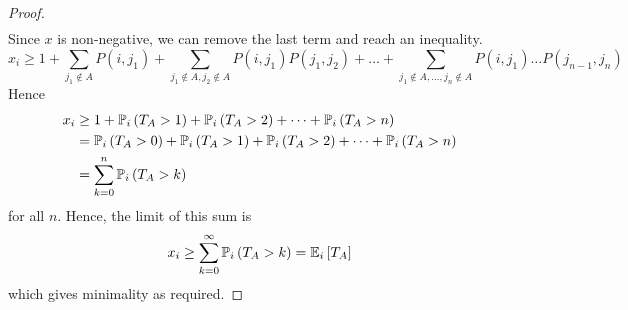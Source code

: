 \begin{proof}
\begin{align*}
	\end{align*}
	Since \( x \) is non-negative, we can remove the last term and reach an inequality.
	\[
		x_i \geq 1 + \sum_{j_1 \not\in A} P(i,j_1) + \sum_{j_1 \not\in A, j_2 \not\in A} P(i,j_1)P(j_1,j_2) + \dots + \sum_{j_1 \not\in A, \dots, j_n \not\in A} P(i,j_1) \dots P(j_{n-1}, j_n)
	\]
	Hence
	\begin{align*}
		x_i &\geq 1 + \mathbb{P}_{i}\left({T_A > 1}\right) + \mathbb{P}_{i}\left({T_A > 2}\right) + \dots + \mathbb{P}_{i}\left({T_A > n}\right)             \\
		 & = \mathbb{P}_{i}\left({T_A > 0}\right) + \mathbb{P}_{i}\left({T_A > 1}\right) + \mathbb{P}_{i}\left({T_A > 2}\right) + \dots + \mathbb{P}_{i}\left({T_A > n}\right) \\
		 & = \sum_{k = 0}^n \mathbb{P}_{i}\left({T_A > k}\right)
	\end{align*}
	for all \( n \).
	Hence, the limit of this sum is
	\[
		x_i \geq \sum_{k=0}^\infty \mathbb{P}_{i}\left({T_A > k}\right) = \mathbb{E}_{i}\left[{T_A}\right]
	\]
	which gives minimality as required.
\end{proof}
